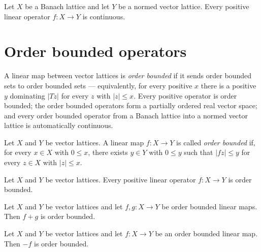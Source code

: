 \begin{theorem}
\label{thm:positive-continuous}
\leanok
{}
Let $X$ be a Banach lattice and let $Y$ be a normed vector
lattice. Every positive linear operator $f \colon X \to Y$ is
continuous.
\end{theorem}

\section{Order bounded operators}

A linear map between vector lattices is \emph{order bounded} if it
sends order bounded sets to order bounded sets — equivalently, for
every positive $x$ there is a positive $y$ dominating $\lvert T z
\rvert$ for every $z$ with $\lvert z \rvert \le x$. Every positive
operator is order bounded; the order bounded operators form a
partially ordered real vector space; and every order bounded
operator from a Banach lattice into a normed vector lattice is
automatically continuous.

\begin{definition}
\label{def:isOrderBounded}
\leanok
{}
Let $X$ and $Y$ be vector lattices. A linear map $f \colon X \to
Y$ is called \emph{order bounded} if, for every $x \in X$ with $0
\le x$, there exists $y \in Y$ with $0 \le y$ such that $\lvert f
z \rvert \le y$ for every $z \in X$ with $\lvert z \rvert \le x$.
\end{definition}

\begin{theorem}
\label{thm:positive-isOrderBounded}
\leanok
{}
Let $X$ and $Y$ be vector lattices. Every positive linear operator
$f \colon X \to Y$ is order bounded.
\end{theorem}

\begin{lemma}
\label{lem:isOrderBounded-add}
\leanok
{}
Let $X$ and $Y$ be vector lattices and let $f, g \colon X \to Y$
be order bounded linear maps. Then $f + g$ is order bounded.
\end{lemma}

\begin{lemma}
\label{lem:isOrderBounded-neg}
\leanok
{}
Let $X$ and $Y$ be vector lattices and let $f \colon X \to Y$ be
an order bounded linear map. Then $-f$ is order bounded.
\end{lemma}

